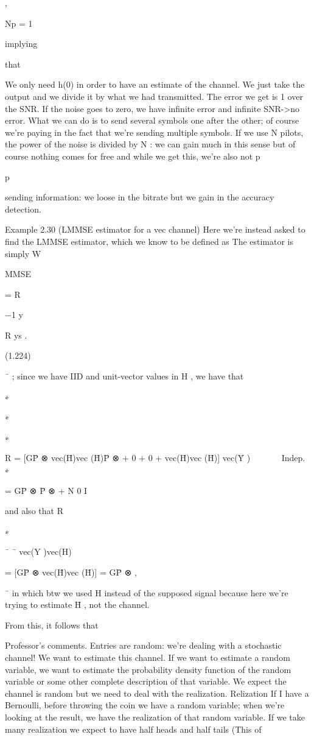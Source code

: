 {{{,

Np = 1

implying

that

We only need h(0) in order to have an estimate of the channel.
We just take the output and we divide it by what we had transmitted.
The error we get is 1 over the SNR. If the noise goes to zero, we have infinite error and infinite SNR->no error.
What we can do is to send several symbols one after the other; of course we're paying in the fact that we're sending multiple symbols.
If we use N pilots, the power of the noise is divided by N : we can gain much in this sense but of course nothing comes for free and while we get this, we're also not p

p

sending information: we loose in the bitrate but we gain in the accuracy detection.

Example 2.30 (LMMSE estimator for a vec channel)
Here we're instead asked to find the LMMSE estimator, which we know to be defined as The estimator is simply W

MMSE

= R

−1 y

R ys .

(1.224)

¯
; since we have IID and unit-vector values in H
, we have that

∗

∗

∗

R
= [GP̄ ⊗ vec(H̄)vec (H̄)P̄ ⊗ + 0 + 0 + vec(H̄)vec (H̄)]
vec(Ȳ )
  


Indep.
∗

= GP̄ ⊗ P̄ ⊗ + N 0 I

and also that R

∗

¯
¯
vec(Y )vec(H)

= [\sqrt GP̄ ⊗ vec(H̄)vec (H̄)] = \sqrt GP̄ ⊗ ,

¯
in which btw we used H instead of the supposed signal because here we're trying to estimate H̄ , not the channel.

From this, it follows that

Professor's comments.
Entries are random: we're dealing with a stochastic channel! We want to estimate this channel.
If we want to estimate a random variable, we want to estimate the probability density function of the random variable or some other complete description of that variable.
We expect the channel is random but we need to deal with the realization.
Relization If I have a Bernoulli, before throwing the coin we have a random variable; when we're looking at the result, we have the realization of that random variable.
If we take many realization we expect to have half heads and half tails (This of

}}}
